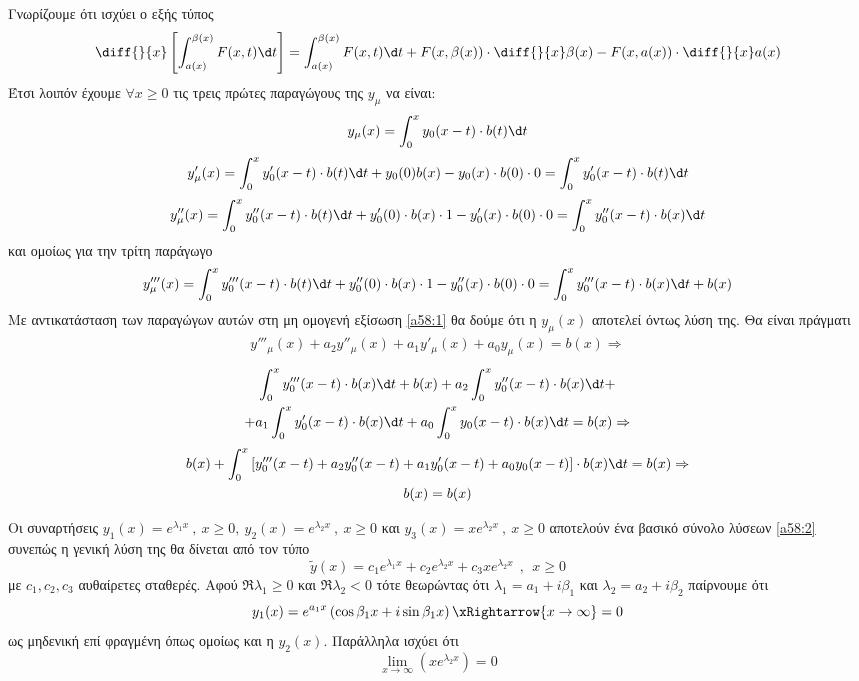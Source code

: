 \documentclass[a4paper,twoside,11pt]{book}
\begin{document}
\begin{rlist}
\item Γνωρίζουμε ότι ισχύει ο εξής τύπος \[ \diff{}{x}\left[ \int_{a(x)}^{\beta(x)}{F(x,t)\d t}\right]=\int_{a(x)}^{\beta(x)}{F(x,t)\d t}+F(x,\beta(x))\cdot\diff{}{x} \beta(x)-F(x,a(x))\cdot\diff{}{x} a(x)  \]
Έτσι λοιπόν έχουμε $ \forall x\geq 0 $ τις τρεις πρώτες παραγώγους της $ y_\mu $ να είναι:
\[ y_\mu(x)=\int_{0}^{x}{y_0(x-t)\cdot b(t)\d t} \]
\[ y'_\mu(x)=\int_{0}^{x}{y_0'(x-t)\cdot b(t)\d t}+y_0(0)b(x)-y_0(x)\cdot b(0)\cdot 0=\int_{0}^{x}{y'_0(x-t)\cdot b(t)\d t} \]
\[ y''_\mu(x)=\int_{0}^{x}{y_0''(x-t)\cdot b(t)\d t}+y'_0(0)\cdot b(x)\cdot 1-y'_0(x)\cdot b(0)\cdot 0=\int_{0}^{x}{y_0''(x-t)\cdot b(x)\d t} \]
και ομοίως για την τρίτη παράγωγο
\[ y'''_\mu(x)=\int_{0}^{x}{y'''_0(x-t)\cdot b(t)\d t}+y''_0(0)\cdot b(x)\cdot 1-y_0''(x)\cdot b(0)\cdot 0=\int_{0}^{x}{y_0'''(x-t)\cdot b(x)\d t}+b(x) \]
Με αντικατάσταση των παραγώγων αυτών στη μη ομογενή εξίσωση \eqref{a58:1} θα δούμε ότι η $ y_\mu(x) $ αποτελεί όντως λύση της. Θα είναι πράγματι
\begin{gather*}
y'''_\mu(x)+a_2y''_\mu(x)+a_1y'_\mu(x)+a_0y_\mu(x)=b(x)\Rightarrow
\end{gather*}
\begin{multline}
\int_{0}^{x}{y_0'''(x-t)\cdot b(x)\d t}+b(x)+a_2\int_{0}^{x}{y_0''(x-t)\cdot b(x)\d t}+\\+a_1\int_{0}^{x}{y_0'(x-t)\cdot b(x)\d t}+a_0\int_{0}^{x}{y_0(x-t)\cdot b(x)\d t}=b(x)\Rightarrow
\end{multline}
\begin{gather*}
b(x)+\int_{0}^{x}{\left[ y_0'''(x-t)+a_2y_0''(x-t)+a_1y_0'(x-t)+a_0y_0(x-t)\right]\cdot b(x)\d t }=b(x)\Rightarrow\\
b(x)=b(x)
\end{gather*}
\item Οι συναρτήσεις $ y_1(x)=e^{\lambda_1x}\ ,\ x\geq 0,\ y_2(x)=e^{\lambda_2 x}\ ,\ x\geq 0 $ και $ y_3(x)=xe^{\lambda_2x}\ ,\ x\geq 0 $ αποτελούν ένα βασικό σύνολο λύσεων \eqref{a58:2} συνεπώς η γενική λύση της θα δίνεται από τον τύπο
\[ \tilde{y}(x)=c_1e^{\lambda_1x}+c_2e^{\lambda_2x}+c_3xe^{\lambda_2 x}\ \ ,\ \ x\geq 0 \]
με $ c_1,c_2,c_3 $ αυθαίρετες σταθερές. Αφού $ \Re{\lambda_1}\geq 0 $ και $ \Re{\lambda_2}<0 $ τότε θεωρώντας ότι $ \lambda_1=a_1+i\beta_1 $ και $ \lambda_2=a_2+i\beta_2 $ παίρνουμε ότι
\[ y_1(x)=e^{a_1x}\left( \cos{\beta_1 x}+i\sin{\beta_1 x}\right)\xRightarrow{x\to\infty}=0 \]
ως μηδενική επί φραγμένη όπως ομοίως και η $ y_2(x) $. Παράλληλα ισχύει ότι \[ \lim_{x\to\infty}{(xe^{\lambda_2x})}=0 \]

\end{rlist}
\end{document}
